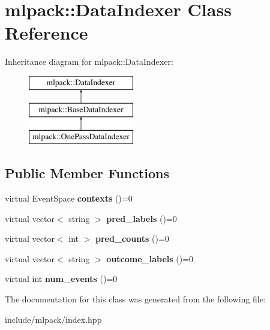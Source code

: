 \hypertarget{classmlpack_1_1_data_indexer}{
\section{mlpack::DataIndexer Class Reference}
\label{classmlpack_1_1_data_indexer}
}
Inheritance diagram for mlpack::DataIndexer:\begin{figure}[H]
\begin{center}
\leavevmode
\includegraphics[height=3.000000cm]{classmlpack_1_1_data_indexer}
\end{center}
\end{figure}
\subsection*{Public Member Functions}
\begin{DoxyCompactItemize}
\item 
\hypertarget{classmlpack_1_1_data_indexer_a6a7edec1bed416e1efd71a23bcb2599a}{
virtual EventSpace {\bfseries contexts} ()=0}
\label{classmlpack_1_1_data_indexer_a6a7edec1bed416e1efd71a23bcb2599a}

\item 
\hypertarget{classmlpack_1_1_data_indexer_a5692f64eefc9003101f3b45d8d20472b}{
virtual vector$<$ string $>$ {\bfseries pred\_\-labels} ()=0}
\label{classmlpack_1_1_data_indexer_a5692f64eefc9003101f3b45d8d20472b}

\item 
\hypertarget{classmlpack_1_1_data_indexer_ab2f0529ade1a9f59e7d39d3da05eccb5}{
virtual vector$<$ int $>$ {\bfseries pred\_\-counts} ()=0}
\label{classmlpack_1_1_data_indexer_ab2f0529ade1a9f59e7d39d3da05eccb5}

\item 
\hypertarget{classmlpack_1_1_data_indexer_afa962d995218071829ec21cac917170c}{
virtual vector$<$ string $>$ {\bfseries outcome\_\-labels} ()=0}
\label{classmlpack_1_1_data_indexer_afa962d995218071829ec21cac917170c}

\item 
\hypertarget{classmlpack_1_1_data_indexer_a003cb740715f17db9c988eef0923f94a}{
virtual int {\bfseries num\_\-events} ()=0}
\label{classmlpack_1_1_data_indexer_a003cb740715f17db9c988eef0923f94a}

\end{DoxyCompactItemize}


The documentation for this class was generated from the following file:\begin{DoxyCompactItemize}
\item 
include/mlpack/index.hpp\end{DoxyCompactItemize}
